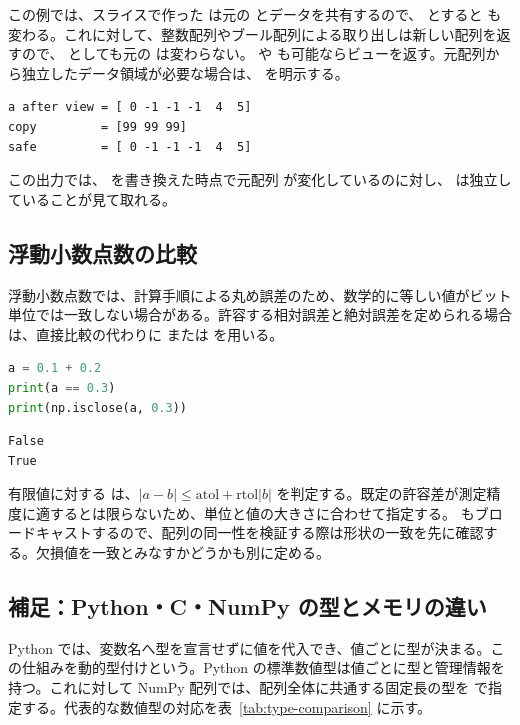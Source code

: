 この例では、スライスで作った  は元の  とデータを共有するので、 とすると  も変わる。これに対して、整数配列やブール配列による取り出しは新しい配列を返すので、 としても元の  は変わらない。 や  も可能ならビューを返す。元配列から独立したデータ領域が必要な場合は、 を明示する。

\begin{lstlisting}[numbers=none, xleftmargin=2\zw]
a after view = [ 0 -1 -1 -1  4  5]
copy         = [99 99 99]
safe         = [ 0 -1 -1 -1  4  5]
\end{lstlisting}

この出力では、 を書き換えた時点で元配列  が変化しているのに対し、 は独立していることが見て取れる。

\subsection{浮動小数点数の比較}

浮動小数点数では、計算手順による丸め誤差のため、数学的に等しい値がビット単位では一致しない場合がある。許容する相対誤差と絶対誤差を定められる場合は、直接比較の代わりに  または  を用いる。

\begin{lstlisting}[language=Python]
a = 0.1 + 0.2
print(a == 0.3)
print(np.isclose(a, 0.3))
\end{lstlisting}

\begin{lstlisting}[numbers=none, xleftmargin=2\zw]
False
True
\end{lstlisting}

有限値に対する  は、\(\lvert a-b\rvert\leq\mathrm{atol}+\mathrm{rtol}\lvert b\rvert\) を判定する。既定の許容差が測定精度に適するとは限らないため、単位と値の大きさに合わせて指定する。 もブロードキャストするので、配列の同一性を検証する際は形状の一致を先に確認する。欠損値を一致とみなすかどうかも別に定める。

\subsection{補足：Python・C・NumPy の型とメモリの違い}
\label{sec:numpy-types}

Python では、変数名へ型を宣言せずに値を代入でき、値ごとに型が決まる。この仕組みを動的型付けという。Python の標準数値型は値ごとに型と管理情報を持つ。これに対して NumPy 配列では、配列全体に共通する固定長の型を  で指定する。代表的な数値型の対応を表~\ref{tab:type-comparison} に示す。

